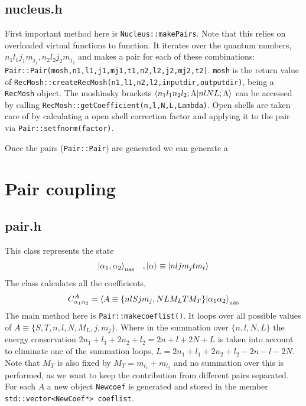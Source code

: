 \documentclass[10pt]{article}
\begin{document}
\subsection{nucleus.h}
First important method here is \texttt{Nucleus::makePairs}. Note that this relies on overloaded virtual functions to function. It iterates over the quantum numbers, $n_1 l_1 j_1 m_{j_1}, n_2 l_2 j_2 m_{j_2}$ and makes a pair for each of these combinations: \texttt{Pair::Pair(mosh,n1,l1,j1,mj1,t1,n2,l2,j2,mj2,t2)}. \texttt{mosh} is the return value of \texttt{RecMosh::createRecMosh(n1,l1,n2,l2,inputdir,outputdir)}, being a \texttt{RecMosh} object. The moshinsky brackets $\braket{n_1 l_1 n_2 l_2; \Lambda | n l N L ; \Lambda}$ can be accessed by calling \texttt{RecMosh::getCoefficient(n,l,N,L,Lambda)}.
Open shells are taken care of by calculating a open shell correction factor and applying it to the pair via \texttt{Pair::setfnorm(factor)}.

Once the pairs (\texttt{Pair::Pair}) are generated we can generate a 



\section{Pair coupling}
\subsection{pair.h}
This class represents the state
\begin{align}
	\ket{ \alpha_1, \alpha_2}_{\textrm{nas}} \;\;\;, \ket{\alpha} \equiv \ket{n l j m_j t m_t}
\end{align}
The class calculates all the coefficients,
\begin{align}
	C_{\alpha_1 \alpha_2}^{A} = \braket{A \equiv \{ n l S j m_j, N L M_L T M_T\} | \alpha_1 \alpha_2}_{\text{nas}}
	\label{eq:coef}
\end{align}
The main method here is \texttt{Pair::makecoeflist()}. It loops over all possible values of $ A \equiv \{ S,T,n,l,N,M_L,j,m_j \}$. Where in the summation over $\{n,l,N,L\}$ the energy conservation $2n_1 + l_1 + 2n_2 + l_2 = 2n + l + 2N + L$ is taken into account to eliminate one of the summation loops, $L = 2n_1 + l_1 + 2n_2 + l_2 - 2n - l - 2N$. Note that $M_T$ is also fixed by $M_T = m_{t_1} + m_{t_2}$ and no summation over this is performed, as we want to keep the contribution from different pairs separated.
For each $A$ a new object \texttt{Newcoef} is generated and stored in the member \texttt{std::vector<NewCoef*> coeflist}.
\end{document}

